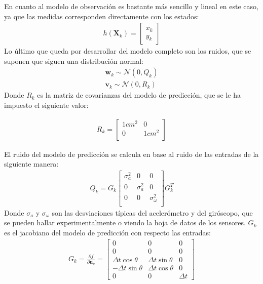 En cuanto al modelo de observación es bastante más sencillo y lineal en este caso, ya que las medidas corresponden directamente con los estados:
\begin{align}
h(\bm{X}_k) =  
\begin{bmatrix} 
x_k \\ y_k
\end{bmatrix}
\end{align}
Lo último que queda por desarrollar del modelo completo son los ruidos, que se suponen que siguen una distribución normal:
\begin{align}
\bm{w}_k \sim \mathcal{N}(0,Q_k) \\
\bm{v}_k \sim \mathcal{N}(0,R_k)
\end{align}
Donde $R_k$ es la matriz de covarianzas del modelo de predicción, que se le ha impuesto el siguiente valor:

\begin{align}
R_k = 
\begin{bmatrix} 
1cm^2 & 0 \\ 0  & 1cm^2\\
\end{bmatrix} 
\end{align}

El ruido del modelo de predicción se calcula en base al ruido de las entradas de la siguiente manera:
\begin{align}
Q_k = 
G_k
\begin{bmatrix} 
\sigma^2_a 	& 0 		& 0\\
0 		& \sigma^2_a 	& 0\\
0 		& 0 		& \sigma^2_\omega\\
\end{bmatrix}
G_k^T
\end{align}
Donde $\sigma_a$ y $\sigma_\omega$ son las desviaciones típicas del acelerómetro y del giróscopo, que se pueden hallar experimentalmente o viendo la hoja de datos de los sensores. $G_k$ es el jacobiano del modelo de predicción con respecto las entradas: 
\begin{align}
G_k =  \frac{\partial f}{\partial \bm{u}_k}=
\begin{bmatrix} 
0 			&0			&0\\
0 			&0			&0\\
\Delta t \cos{\theta} 	&\Delta t \sin{\theta}	&0\\
-\Delta t \sin{\theta} 	&\Delta t \cos{\theta}	&0\\
0 			&0			&\Delta t		
\end{bmatrix}
\end{align}

